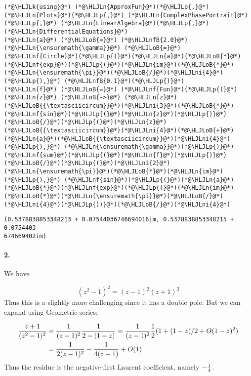 \documentclass[12pt,landscape]{article}
\newcommand{\HLJLk}[1]{\textcolor[RGB]{148,91,176}{\textbf{#1}}}
\newcommand{\HLJLn}[1]{#1}
\newcommand{\HLJLnf}[1]{\textcolor[RGB]{66,102,213}{#1}}
\newcommand{\HLJLnfB}[1]{\textcolor[RGB]{59,151,46}{#1}}
\newcommand{\HLJLni}[1]{\textcolor[RGB]{59,151,46}{#1}}
\newcommand{\HLJLoB}[1]{\textcolor[RGB]{102,102,102}{\textbf{#1}}}
\newcommand{\HLJLp}[1]{#1}
\begin{document}
{\begin{lstlisting}
(*@\HLJLk{using}@*) (*@\HLJLn{ApproxFun}@*)(*@\HLJLp{,}@*) (*@\HLJLn{Plots}@*)(*@\HLJLp{,}@*) (*@\HLJLn{ComplexPhasePortrait}@*)(*@\HLJLp{,}@*) (*@\HLJLn{LinearAlgebra}@*)(*@\HLJLp{,}@*) (*@\HLJLn{DifferentialEquations}@*)
(*@\HLJLn{a}@*) (*@\HLJLoB{=}@*) (*@\HLJLnfB{2.0}@*)
(*@\HLJLn{\ensuremath{\gamma}}@*) (*@\HLJLoB{=}@*) (*@\HLJLnf{Circle}@*)(*@\HLJLp{(}@*)(*@\HLJLn{a}@*)(*@\HLJLoB{*}@*)(*@\HLJLnf{exp}@*)(*@\HLJLp{(}@*)(*@\HLJLn{im}@*)(*@\HLJLoB{*}@*)(*@\HLJLn{\ensuremath{\pi}}@*)(*@\HLJLoB{/}@*)(*@\HLJLni{4}@*)(*@\HLJLp{),}@*) (*@\HLJLnfB{0.1}@*)(*@\HLJLp{)}@*)
(*@\HLJLn{f}@*) (*@\HLJLoB{=}@*) (*@\HLJLnf{Fun}@*)(*@\HLJLp{(}@*)(*@\HLJLn{z}@*) (*@\HLJLoB{->}@*) (*@\HLJLn{z}@*)(*@\HLJLoB{{\textasciicircum}}@*)(*@\HLJLni{3}@*)(*@\HLJLoB{*}@*)(*@\HLJLnf{sin}@*)(*@\HLJLp{(}@*)(*@\HLJLn{z}@*)(*@\HLJLp{)}@*)(*@\HLJLoB{/}@*)(*@\HLJLp{(}@*)(*@\HLJLn{z}@*)(*@\HLJLoB{{\textasciicircum}}@*)(*@\HLJLni{4}@*)(*@\HLJLoB{+}@*)(*@\HLJLn{a}@*)(*@\HLJLoB{{\textasciicircum}}@*)(*@\HLJLni{4}@*)(*@\HLJLp{),}@*) (*@\HLJLn{\ensuremath{\gamma}}@*)(*@\HLJLp{)}@*)
(*@\HLJLnf{sum}@*)(*@\HLJLp{(}@*)(*@\HLJLn{f}@*)(*@\HLJLp{)}@*)(*@\HLJLoB{/}@*)(*@\HLJLp{(}@*)(*@\HLJLni{2}@*)(*@\HLJLn{\ensuremath{\pi}}@*)(*@\HLJLoB{*}@*)(*@\HLJLn{im}@*)(*@\HLJLp{),}@*) (*@\HLJLnf{sin}@*)(*@\HLJLp{(}@*)(*@\HLJLn{a}@*)(*@\HLJLoB{*}@*)(*@\HLJLnf{exp}@*)(*@\HLJLp{(}@*)(*@\HLJLn{im}@*)(*@\HLJLoB{*}@*)(*@\HLJLn{\ensuremath{\pi}}@*)(*@\HLJLoB{/}@*)(*@\HLJLni{4}@*)(*@\HLJLp{))}@*)(*@\HLJLoB{/}@*)(*@\HLJLni{4}@*)
\end{lstlisting}

\begin{lstlisting}
(0.5378838853348213 + 0.07544036746694016im, 0.5378838853348215 + 0.0754403
674669402im)
\end{lstlisting}

\newpage
\paragraph{2.}
We have

\[
(z^2-1)^2 = (z-1)^2(z+1)^2
\]
Thus this is a slightly more challenging since it has a double pole. But we can expand using Geometric series:

\begin{align*}
    {z+1 \over (z^2-1)^2} & = {1 \over (z-1)^2} {1 \over 2 - (1-z)} = {1 \over (z-1)^2} {1 \over 2} (1 + (1-z)/2 +O(1-z)^2)\\
    & = {1 \over 2(z-1)^2} - {1 \over 4 (z-1)}  + O(1)
\end{align*}
Thus the residue is the negative-first Laurent coefficient, namely $-{1 \over 4}$.

}
\end{document}
